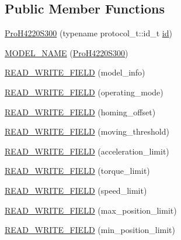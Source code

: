 \subsection*{Public Member Functions}
\begin{DoxyCompactItemize}
\item 
\hyperlink{classdynamixel_1_1servos_1_1_pro_h4220_s300_adc67078144dd29767d39d690a85ab011}{Pro\+H4220\+S300} (typename protocol\+\_\+t\+::id\+\_\+t \hyperlink{classdynamixel_1_1servos_1_1_servo_a2d022081672e25a7bb57b76706e1cc57}{id})
\item 
\hyperlink{classdynamixel_1_1servos_1_1_pro_h4220_s300_a6b8da72098c3c637e9b9d4b4270596fc}{M\+O\+D\+E\+L\+\_\+\+N\+A\+ME} (\hyperlink{classdynamixel_1_1servos_1_1_pro_h4220_s300}{Pro\+H4220\+S300})
\item 
\hyperlink{classdynamixel_1_1servos_1_1_pro_h4220_s300_a060c5877abd4e1bfb53fb8885a3d7430}{R\+E\+A\+D\+\_\+\+W\+R\+I\+T\+E\+\_\+\+F\+I\+E\+LD} (model\+\_\+info)
\item 
\hyperlink{classdynamixel_1_1servos_1_1_pro_h4220_s300_a06778fd4182a06e0c6aef4c2ce3f81e2}{R\+E\+A\+D\+\_\+\+W\+R\+I\+T\+E\+\_\+\+F\+I\+E\+LD} (operating\+\_\+mode)
\item 
\hyperlink{classdynamixel_1_1servos_1_1_pro_h4220_s300_a4c6a9477dee9296e1200af5963a82bbd}{R\+E\+A\+D\+\_\+\+W\+R\+I\+T\+E\+\_\+\+F\+I\+E\+LD} (homing\+\_\+offset)
\item 
\hyperlink{classdynamixel_1_1servos_1_1_pro_h4220_s300_ae0afe404295a6f2679629fec746d0724}{R\+E\+A\+D\+\_\+\+W\+R\+I\+T\+E\+\_\+\+F\+I\+E\+LD} (moving\+\_\+threshold)
\item 
\hyperlink{classdynamixel_1_1servos_1_1_pro_h4220_s300_a4ecdf974ff85f9de923d51a3b607ef40}{R\+E\+A\+D\+\_\+\+W\+R\+I\+T\+E\+\_\+\+F\+I\+E\+LD} (acceleration\+\_\+limit)
\item 
\hyperlink{classdynamixel_1_1servos_1_1_pro_h4220_s300_aef6c1baa0bc965f77e86bd296e4fe195}{R\+E\+A\+D\+\_\+\+W\+R\+I\+T\+E\+\_\+\+F\+I\+E\+LD} (torque\+\_\+limit)
\item 
\hyperlink{classdynamixel_1_1servos_1_1_pro_h4220_s300_a2c9d640120dca709fb9f09cb57f17a96}{R\+E\+A\+D\+\_\+\+W\+R\+I\+T\+E\+\_\+\+F\+I\+E\+LD} (speed\+\_\+limit)
\item 
\hyperlink{classdynamixel_1_1servos_1_1_pro_h4220_s300_af159fd2d3231af7d7bdfaee24344f1ac}{R\+E\+A\+D\+\_\+\+W\+R\+I\+T\+E\+\_\+\+F\+I\+E\+LD} (max\+\_\+position\+\_\+limit)
\item 
\hyperlink{classdynamixel_1_1servos_1_1_pro_h4220_s300_ac17cd6737808bd4f48c51f634ef8fd21}{R\+E\+A\+D\+\_\+\+W\+R\+I\+T\+E\+\_\+\+F\+I\+E\+LD} (min\+\_\+position\+\_\+limit)

\end{DoxyCompactItemize}
